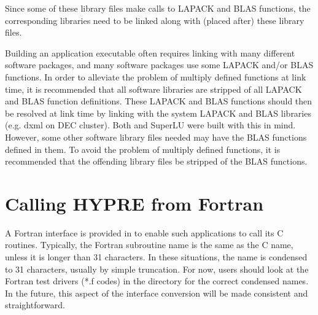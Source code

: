 Since some of these library files make calls to LAPACK and BLAS functions, 
the corresponding libraries need to be linked along with (placed after) these 
library files.  


Building an application executable often requires linking with many different
software packages, and many software packages use some LAPACK and/or BLAS
functions.  In order to alleviate the problem of multiply defined functions
at link time, it is recommended that all software libraries are stripped of
all LAPACK and BLAS function definitions.  These LAPACK and BLAS functions 
should then be resolved at link time by linking with the system LAPACK and
BLAS libraries (e.g. dxml on DEC cluster).  Both \hypre{} and SuperLU were
built with this in mind.  However, some other software library files needed
may have the BLAS functions defined in them.  To avoid the problem of
multiply defined functions, it is recommended that the offending library
files be stripped of the BLAS functions.



\section{Calling HYPRE from Fortran}

A Fortran interface is provided in \hypre{} to enable such applications to call its C
routines.  Typically, the Fortran subroutine name is the same as the C name, unless 
it is longer than 31 characters.  In these situations, the name is condensed to 31
characters, usually by simple truncation.  For now, users should look at the Fortran 
test drivers (*.f codes) in the  directory for the correct condensed 
names.  In the future, this aspect of the interface conversion will be made 
consistent and straightforward.

